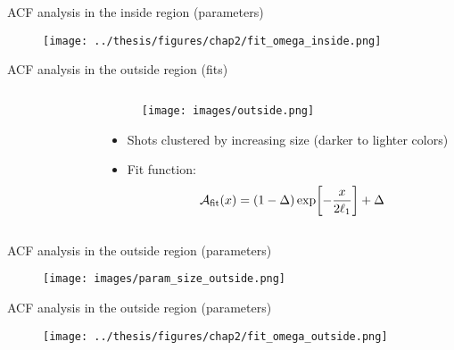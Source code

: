 \documentclass[aspectratio=169]{beamer}
\begin{document}
\begin{frame}{ACF analysis in the inside region (parameters)}
  \begin{figure}
      \centering
      \texttt{[image: ../thesis/figures/chap2/fit\_omega\_inside.png]}
  \end{figure}
\end{frame}

\begin{frame}{ACF analysis in the outside region (fits)}
  \begin{columns}
    \begin{column}{0.55\textwidth}
      \begin{figure}
        \centering
      \end{figure}
    \end{column}
    \begin{column}{0.45\textwidth}
      \begin{figure}
        \centering
        \texttt{[image: images/outside.png]}
      \end{figure}
      \begin{itemize}
        \item Shots clustered by increasing size (darker to lighter colors)
        \item Fit function:
        \[
          \mathcal{A}_{\rm fit}(x) = (1-\Delta)\exp[-\frac{x}{2\ell_1}] + \Delta
        \]
      \end{itemize}
    \end{column}
  \end{columns}
\end{frame}

\begin{frame}{ACF analysis in the outside region (parameters)}
  \begin{figure}
    \centering
    \texttt{[image: images/param\_size\_outside.png]}
  \end{figure}
\end{frame}

\begin{frame}{ACF analysis in the outside region (parameters)}
  \begin{figure}
      \centering
      \texttt{[image: ../thesis/figures/chap2/fit\_omega\_outside.png]}
  \end{figure}
\end{frame}
\end{document}
